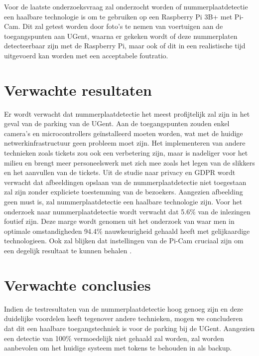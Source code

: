 Voor de laatste onderzoeksvraag zal onderzocht worden of nummerplaatdetectie een haalbare technologie is om te gebruiken op een Raspberry Pi 3B+ met Pi-Cam. Dit zal getest worden door foto’s te nemen van voertuigen aan de toegangspunten aan UGent, waarna er gekeken wordt of deze nummerplaten detecteerbaar zijn met de Raspberry Pi, maar ook of dit in een realistische tijd uitgevoerd kan worden met een acceptabele foutratio.

\section{Verwachte resultaten}
\label{sec:verwachte_resultaten}

Er wordt verwacht dat nummerplaatdetectie het meest profijtelijk zal zijn in het geval van de parking van de UGent. Aan de toegangspunten zouden enkel camera’s en microcontrollers geïnstalleerd moeten worden, wat met de huidige netwerkinfrastructuur geen probleem moet zijn. Het implementeren van andere technieken zoals tickets zou ook een verbetering zijn, maar is nadeliger voor het milieu en brengt meer personeelswerk met zich mee zoals het legen van de slikkers en het aanvullen van de tickets.
Uit de studie naar privacy en GDPR wordt verwacht dat afbeeldingen opslaan van de nummerplaatdetectie niet toegestaan zal zijn zonder expliciete toestemming van de bezoekers. Aangezien afbeelding geen must is, zal nummerplaatdetectie een haalbare technologie zijn.
Voor het onderzoek naar nummerplaatdetectie wordt verwacht dat 5.6\% van de inlezingen foutief zijn. Deze marge wordt genomen uit het onderzoek van \textcite{figuerola2016automated} waar men in optimale omstandigheden 94.4\% nauwkeurigheid gehaald heeft met gelijkaardige technologieen.
Ook zal blijken dat instellingen van de Pi-Cam cruciaal zijn om een degelijk resultaat te kunnen behalen \autocite{gurney2013effect}.

\section{Verwachte conclusies}
\label{sec:verwachte_conclusies}

Indien de testresultaten van de nummerplaatdetectie hoog genoeg zijn en deze duidelijke voordelen heeft tegenover andere technieken, mogen we concluderen dat dit een haalbare toegangstechniek is voor de parking bij de UGent. Aangezien een detectie van 100\% vermoedelijk niet gehaald zal worden, zal worden aanbevolen om het huidige systeem met tokens te behouden in als backup.

